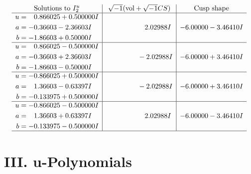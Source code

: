 \documentclass[1p]{elsarticle_modified}
\theoremstyle{definition}
\newcommand{\I}{\sqrt{-1}}
\begin{document}
$$\begin{array}{c|c|c}  
\text{Solutions to }I^u_{2}& \I (\text{vol} + \sqrt{-1}CS) & \text{Cusp shape}\\
 \hline 
\begin{aligned}
u &= \phantom{-}0.866025 + 0.500000 I \\
a &= -0.36603 - 2.36603 I \\
b &= -1.86603 + 0.50000 I\end{aligned}
 & \phantom{-0.000000 -}2.02988 I & -6.00000 - 3.46410 I \\ \hline\begin{aligned}
u &= \phantom{-}0.866025 - 0.500000 I \\
a &= -0.36603 + 2.36603 I \\
b &= -1.86603 - 0.50000 I\end{aligned}
 & \phantom{-0.000000 } -2.02988 I & -6.00000 + 3.46410 I \\ \hline\begin{aligned}
u &= -0.866025 + 0.500000 I \\
a &= \phantom{-}1.36603 - 0.63397 I \\
b &= -0.133975 + 0.500000 I\end{aligned}
 & \phantom{-0.000000 } -2.02988 I & -6.00000 + 3.46410 I \\ \hline\begin{aligned}
u &= -0.866025 - 0.500000 I \\
a &= \phantom{-}1.36603 + 0.63397 I \\
b &= -0.133975 - 0.500000 I\end{aligned}
 & \phantom{-0.000000 -}2.02988 I & -6.00000 - 3.46410 I\\
 \hline 
 \end{array}$$\newpage
\newpage\renewcommand{\arraystretch}{1}
\centering \section*{ III. u-Polynomials}
\end{document}
